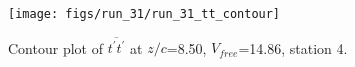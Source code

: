 \begin{figure}[H]
\centering
\texttt{[image: figs/run\_31/run\_31\_tt\_contour]}
\caption{Contour plot of $\overline{t^\prime t^\prime}$ at $z/c$=8.50, $V_{free}$=14.86, station 4.}
\label{fig:run_31_tt_contour}
\end{figure}


